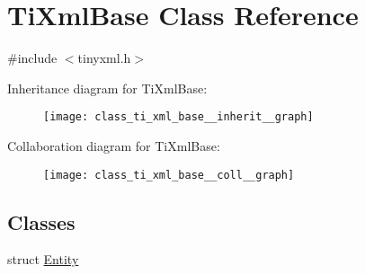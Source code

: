 \hypertarget{class_ti_xml_base}{\section{\-Ti\-Xml\-Base \-Class \-Reference}
\label{class_ti_xml_base}
}


{\ttfamily \#include $<$tinyxml.\-h$>$}



\-Inheritance diagram for \-Ti\-Xml\-Base\-:\nopagebreak
\begin{figure}[H]
\begin{center}
\leavevmode
\texttt{[image: class\_ti\_xml\_base\_\_inherit\_\_graph]}
\end{center}
\end{figure}


\-Collaboration diagram for \-Ti\-Xml\-Base\-:\nopagebreak
\begin{figure}[H]
\begin{center}
\leavevmode
\texttt{[image: class\_ti\_xml\_base\_\_coll\_\_graph]}
\end{center}
\end{figure}
\subsection*{\-Classes}
\begin{DoxyCompactItemize}
\item 
struct \hyperlink{struct_ti_xml_base_1_1_entity}{\-Entity}
\end{DoxyCompactItemize}
